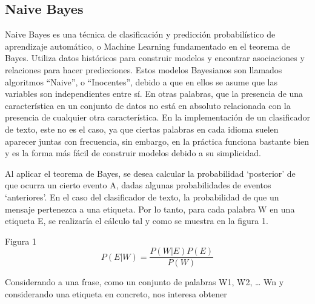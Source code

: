 \documentclass[sigconf]{acmart}
\begin{document}
\subsection{Naive Bayes}
Naive Bayes es una técnica de clasificación y predicción probabilístico de aprendizaje automático, o Machine Learning fundamentado en el teorema de Bayes. Utiliza datos históricos para construir modelos y encontrar asociaciones y relaciones para hacer predicciones. Estos modelos Bayesianos son llamados algoritmos “Naive”, o “Inocentes”, debido  a que en ellos se asume que las variables son independientes entre sí. En otras palabras, que la presencia de una característica en un conjunto de datos no está en absoluto relacionada con la presencia de cualquier otra característica. En la implementación de un clasificador de texto, este no es el caso, ya que ciertas palabras en cada idioma suelen aparecer juntas con frecuencia, sin embargo, en la práctica funciona bastante bien y es la forma más fácil de construir modelos debido a su simplicidad.

Al aplicar el teorema de Bayes, se desea calcular la probabilidad ‘posterior’ de que ocurra un cierto evento A, dadas algunas probabilidades de eventos ‘anteriores’. En el caso del clasificador de texto, la probabilidad de que un mensaje pertenezca a una etiqueta. Por lo tanto, para cada palabra W en una etiqueta E, se realizaría el cálculo tal y como se muestra en la figura 1. \citep{Rincon}\citep{Roman}

Figura 1
\begin{equation}
\label{eq:bayes}
P(E|W) = \frac {P(W|E) P(E)} {P(W)}
\end{equation}

Considerando a una frase, como un conjunto de palabras {W1, W2, … Wn} y considerando una etiqueta en concreto, nos interesa obtener
\end{document}
